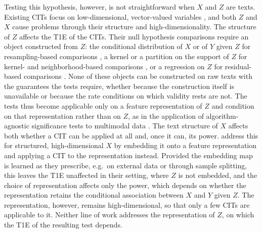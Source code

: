 \documentclass[twoside,11pt]{article}
\begin{document}
Testing this hypothesis, however, is not straightforward when $X$ and $Z$ are texts.
Existing CITs focus on low-dimensional, vector-valued variables \citep{li2020nonparametric}, and both $Z$ and $X$ cause problems through their structure and high-dimensionality. %
The structure of $Z$ affects the T1E of the CITs. Their null hypothesis comparisons require an object constructed from $Z$: the conditional distribution of $X$ or of $Y$ given $Z$ for resampling-based comparisons \citep{candes2018panning,berrett2020conditional}, a kernel or a partition on the support of $Z$ for kernel- and neighborhood-based comparisons \citep{zhang2011kernel, strobl2019approximate}, or a regression on $Z$ for residual-based comparisons \citep{shah2020hardness,lundborg2024projected}.
None of these objects can be constructed on raw texts with the guarantees the tests require, whether because the construction itself is unavailable or because the rate conditions on which validity rests are not. The tests thus become applicable only on a feature representation of $Z$ and condition on that representation rather than on $Z$, as in the application of algorithm-agnostic significance tests to multimodal data \citep{kook2024algorithm}.
The text structure of $X$ affects both whether a CIT can be applied at all and, once it can, its power. \citet{simnacher2026deep} address this for structured, high-dimensional $X$ by embedding it onto a feature representation and applying a CIT to the representation instead. Provided the embedding map is learned as they prescribe, e.g.\ on external data or through sample splitting, this leaves the T1E unaffected in their setting, where $Z$ is not embedded, and the choice of representation affects only the power, which depends on whether the representation retains the conditional association between $X$ and $Y$ given $Z$.
The representation, however, remains high-dimensional, so that only a few CITs are applicable to it. 
Neither line of work addresses the representation of $Z$, on which the T1E of the resulting test depends.
\end{document}
